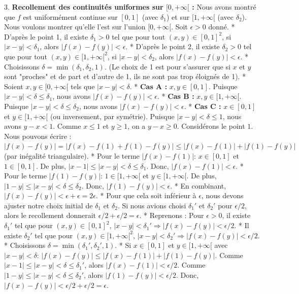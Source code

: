 \documentclass[12pt,a4paper]{report}
\begin{document}
3.  \textbf{Recollement des continuités uniformes sur $[0, +\infty[$ :}
    Nous avons montré que $f$ est uniformément continue sur $[0, 1]$ (avec $\delta_1$) et sur $[1, +\infty[$ (avec $\delta_2$). Nous voulons montrer qu'elle l'est sur l'union $[0, +\infty[$.
    Soit $\epsilon > 0$ donné.
    *   D'après le point 1, il existe $\delta_1 > 0$ tel que pour tout $(x, y) \in [0, 1]^2$, si $|x - y| < \delta_1$, alors $|f(x) - f(y)| < \epsilon$.
    *   D'après le point 2, il existe $\delta_2 > 0$ tel que pour tout $(x, y) \in [1, +\infty[^2$, si $|x - y| < \delta_2$, alors $|f(x) - f(y)| < \epsilon$.
    *   Choisissons $\delta = \min(\delta_1, \delta_2, 1)$. (Le choix de 1 est pour s'assurer que si $x$ et $y$ sont "proches" et de part et d'autre de 1, ils ne sont pas trop éloignés de 1).
    *   Soient $x, y \in [0, +\infty[$ tels que $|x - y| < \delta$.
    *   \textbf{Cas A :} $x, y \in [0, 1]$.
        Puisque $|x - y| < \delta \le \delta_1$, nous avons $|f(x) - f(y)| < \epsilon$.
    *   \textbf{Cas B :} $x, y \in [1, +\infty[$.
        Puisque $|x - y| < \delta \le \delta_2$, nous avons $|f(x) - f(y)| < \epsilon$.
    *   \textbf{Cas C :} $x \in [0, 1]$ et $y \in [1, +\infty[$ (ou inversement, par symétrie).
        Puisque $|x - y| < \delta \le 1$, nous avons $y - x < 1$.
        Comme $x \le 1$ et $y \ge 1$, on a $y-x \ge 0$.
        Considérons le point $1$. Nous pouvons écrire :
        $|f(x) - f(y)| = |f(x) - f(1) + f(1) - f(y)| \le |f(x) - f(1)| + |f(1) - f(y)|$ (par inégalité triangulaire).
        *   Pour le terme $|f(x) - f(1)|$: $x \in [0, 1]$ et $1 \in [0, 1]$. De plus, $|x - 1| \le |x - y| < \delta \le \delta_1$.
            Donc, $|f(x) - f(1)| < \epsilon$.
        *   Pour le terme $|f(1) - f(y)|$: $1 \in [1, +\infty[$ et $y \in [1, +\infty[$. De plus, $|1 - y| \le |x - y| < \delta \le \delta_2$.
            Donc, $|f(1) - f(y)| < \epsilon$.
        *   En combinant, $|f(x) - f(y)| < \epsilon + \epsilon = 2\epsilon$.
        *   Pour que cela soit inférieur à $\epsilon$, nous devons ajuster notre choix initial de $\delta_1$ et $\delta_2$. Si nous avions choisi $\delta_1'$ et $\delta_2'$ pour $\epsilon/2$, alors le recollement donnerait $\epsilon/2 + \epsilon/2 = \epsilon$.
        *   Reprenons : Pour $\epsilon > 0$, il existe $\delta_1'$ tel que pour $(x,y) \in [0,1]^2$, $|x-y|<\delta_1' \Rightarrow |f(x)-f(y)| < \epsilon/2$.
        *   Il existe $\delta_2'$ tel que pour $(x,y) \in [1,+\infty[^2$, $|x-y|<\delta_2' \Rightarrow |f(x)-f(y)| < \epsilon/2$.
        *   Choisissons $\delta = \min(\delta_1', \delta_2', 1)$.
        *   Si $x \in [0,1]$ et $y \in [1,+\infty[$ avec $|x-y|<\delta$:
            $|f(x)-f(y)| \le |f(x)-f(1)| + |f(1)-f(y)|$.
            Comme $|x-1| \le |x-y| < \delta \le \delta_1'$, alors $|f(x)-f(1)| < \epsilon/2$.
            Comme $|1-y| \le |x-y| < \delta \le \delta_2'$, alors $|f(1)-f(y)| < \epsilon/2$.
            Donc, $|f(x)-f(y)| < \epsilon/2 + \epsilon/2 = \epsilon$.
\end{document}
